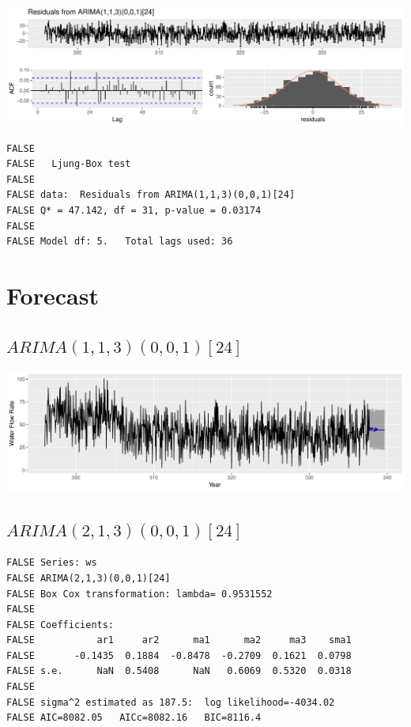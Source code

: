 \documentclass[openany]{book}
\begin{document}
\includegraphics{Group2_Project1_Fall2019_files/figure-latex/unnamed-chunk-24-1.pdf}

\begin{verbatim}
FALSE 
FALSE   Ljung-Box test
FALSE 
FALSE data:  Residuals from ARIMA(1,1,3)(0,0,1)[24]
FALSE Q* = 47.142, df = 31, p-value = 0.03174
FALSE 
FALSE Model df: 5.   Total lags used: 36
\end{verbatim}

\hypertarget{forecast-2}{%
\section{Forecast}\label{forecast-2}}

\hypertarget{arima11300124}{%
\subsection{\texorpdfstring{\(ARIMA(1,1,3)(0,0,1)[24]\)}{ARIMA(1,1,3)(0,0,1){[}24{]}}}\label{arima11300124}}

\includegraphics{Group2_Project1_Fall2019_files/figure-latex/unnamed-chunk-25-1.pdf}

\hypertarget{arima21300124}{%
\subsection{\texorpdfstring{\(ARIMA(2,1,3)(0,0,1)[24]\)}{ARIMA(2,1,3)(0,0,1){[}24{]}}}\label{arima21300124}}

\begin{verbatim}
FALSE Series: ws 
FALSE ARIMA(2,1,3)(0,0,1)[24] 
FALSE Box Cox transformation: lambda= 0.9531552 
FALSE 
FALSE Coefficients:
FALSE           ar1     ar2      ma1      ma2     ma3    sma1
FALSE       -0.1435  0.1884  -0.8478  -0.2709  0.1621  0.0798
FALSE s.e.      NaN  0.5408      NaN   0.6069  0.5320  0.0318
FALSE 
FALSE sigma^2 estimated as 187.5:  log likelihood=-4034.02
FALSE AIC=8082.05   AICc=8082.16   BIC=8116.4
\end{verbatim}
\end{document}
